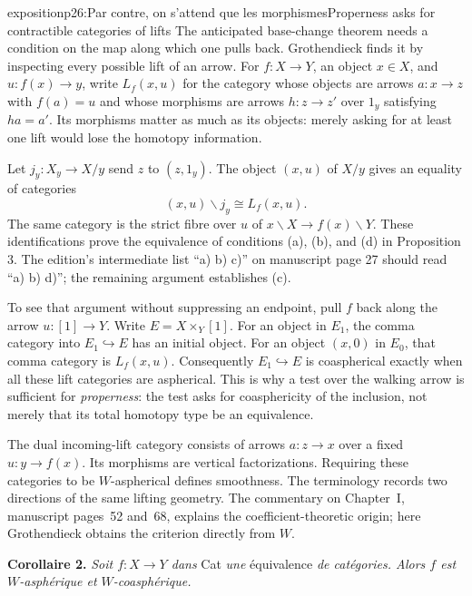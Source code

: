 \begin{dcomment}{exposition}{p26:Par contre, on s'attend que les morphismes}{Properness asks for contractible categories of lifts}
The anticipated base-change theorem needs a condition on the map along which one pulls back. Grothendieck finds it by inspecting every possible lift of an arrow. For $f:X\to Y$, an object $x\in X$, and $u:f(x)\to y$, write $L_f(x,u)$ for the category whose objects are arrows $a:x\to z$ with $f(a)=u$ and whose morphisms are arrows $h:z\to z'$ over $1_y$ satisfying $ha=a'$. Its morphisms matter as much as its objects: merely asking for at least one lift would lose the homotopy information.

Let $j_y:X_y\to X/y$ send $z$ to $(z,1_y)$. The object $(x,u)$ of $X/y$ gives an equality of categories
\[
 (x,u)\backslash j_y\cong L_f(x,u).
\]
The same category is the strict fibre over $u$ of $x\backslash X\to f(x)\backslash Y$. These identifications prove the equivalence of conditions (a), (b), and (d) in Proposition 3. The edition's intermediate list ``a) b) c)'' on manuscript page 27 should read ``a) b) d)''; the remaining argument establishes (c).

To see that argument without suppressing an endpoint, pull $f$ back along the arrow $u:[1]\to Y$. Write $E=X\times_Y[1]$. For an object in $E_1$, the comma category into $E_1\hookrightarrow E$ has an initial object. For an object $(x,0)$ in $E_0$, that comma category is $L_f(x,u)$. Consequently $E_1\hookrightarrow E$ is coaspherical exactly when all these lift categories are aspherical. This is why a test over the walking arrow is sufficient for \emph{properness}: the test asks for coasphericity of the inclusion, not merely that its total homotopy type be an equivalence.

The dual incoming-lift category consists of arrows $a:z\to x$ over a fixed $u:y\to f(x)$. Its morphisms are vertical factorizations. Requiring these categories to be $W$-aspherical defines smoothness. The terminology records two directions of the same lifting geometry. The commentary on Chapter~I, manuscript pages~52 and~68, explains the coefficient-theoretic origin; here Grothendieck obtains the criterion directly from $W$.
\end{dcomment}


\textbf{Corollaire 2.} \textit{Soit $f : X \longrightarrow Y$ dans} \textup{Cat} \textit{une} \textup{équivalence} \textit{de catégories. Alors $f$ est $W$-asphérique et $W$-coasphérique.}

